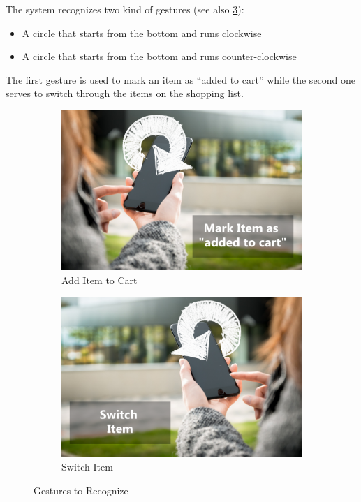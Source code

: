 The system recognizes two kind of gestures (see also
\ref{fig:gesturesToRecognize}):
\begin{itemize}
  \item A circle that starts from the bottom and runs clockwise
  \item A circle that starts from the bottom and runs counter-clockwise
\end{itemize}
The first gesture is used to mark an item as ``added to cart'' while the second
one serves to switch through the items on the shopping list.

\begin{figure}[h]
\captionsetup{justification=centering}
\begin{subfigure}{0.475\textwidth}
\includegraphics[width=\textwidth]{res/gestures/addToCart.png}
\caption{Add Item to Cart}
\label{fig:gestureAdd}
\end{subfigure} \hspace{0.05\textwidth}
\begin{subfigure}{0.475\textwidth}
\includegraphics[width=\textwidth]{res/gestures/removeFromCart.png}
\caption{Switch Item}
\label{fig:gestureRemove}
\end{subfigure}
\caption{Gestures to Recognize}
\label{fig:gesturesToRecognize}
\end{figure}